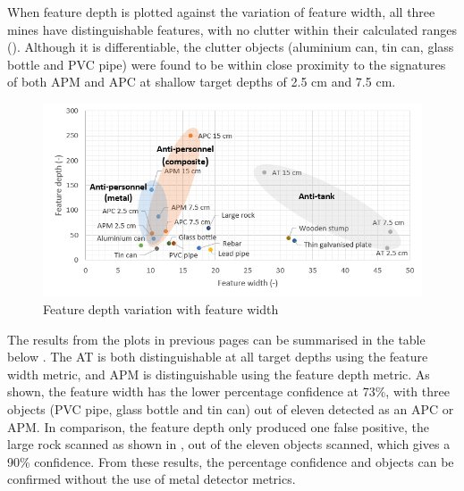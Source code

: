 \documentclass[main.tex]{subfiles}
\begin{document}
When feature depth is plotted against the variation of feature width, all three mines have distinguishable features, with no clutter within their calculated ranges (). Although it is differentiable, the clutter objects (aluminium can, tin can, glass bottle and PVC pipe) were found to be within close proximity to the signatures of both APM and APC at shallow target depths of 2.5 cm and 7.5 cm.

\begin{figure}[!ht]
\includegraphics[width=\textwidth]{5-Testing/depthWidth.PNG}
\centering
\caption{Feature depth variation with feature width}
\end{figure}

The results from the plots in previous pages can be summarised in the table below . The AT is both distinguishable at all target depths using the feature width metric, and APM is distinguishable using the feature depth metric. As shown, the feature width has the lower percentage confidence at 73\%, with three objects (PVC pipe, glass bottle and tin can) out of eleven detected as an APC or APM. In comparison, the feature depth only produced one false positive, the large rock scanned as shown in , out of the eleven objects scanned, which gives a 90\% confidence. From these results, the percentage confidence and objects can be confirmed without the use of metal detector metrics. 
\end{document}
